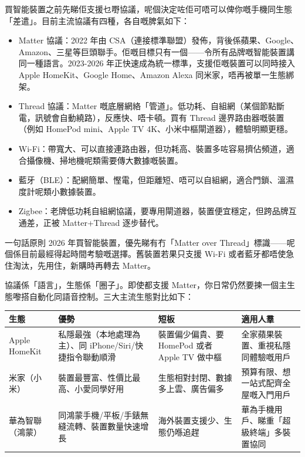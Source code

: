 


買智能裝置之前先睇佢支援乜嘢協議，呢個決定咗佢可唔可以俾你嘅手機同生態「差遣」。目前主流協議有四種，各自嘅脾氣如下：

\begin{itemize}
  \item Matter 協議：2022 年由 CSA（連接標準聯盟）發佈，背後係蘋果、Google、Amazon、三星等巨頭聯手。佢嘅目標只有一個——令所有品牌嘅智能裝置講同一種語言。2023-2026 年正快速成為統一標準，支援佢嘅裝置可以同時接入 Apple HomeKit、Google Home、Amazon Alexa 同米家，唔再被單一生態綁架。
  \item Thread 協議：Matter 嘅底層網絡「管道」。低功耗、自組網（某個節點斷電，訊號會自動繞路），反應快、唔卡頓。買有 Thread 邊界路由器嘅裝置（例如 HomePod mini、Apple TV 4K、小米中樞閘道器），體驗明顯更穩。
  \item Wi-Fi：帶寬大、可以直接連路由器，但功耗高、裝置多咗容易擠佔頻道，適合攝像機、掃地機呢類需要傳大數據嘅裝置。
  \item 藍牙（BLE）：配網簡單、慳電，但距離短、唔可以自組網，適合門鎖、溫濕度計呢類小數據裝置。
  \item Zigbee：老牌低功耗自組網協議，要專用閘道器，裝置便宜穩定，但跨品牌互通差，正被 Matter+Thread 逐步替代。
\end{itemize}

\begin{tcbinfo}{一句話原則}
2026 年買智能裝置，優先睇有冇「Matter over Thread」標識——呢個係目前最經得起時間考驗嘅選擇。舊裝置若果只支援 Wi-Fi 或者藍牙都唔使急住淘汰，先用住，新購時再轉去 Matter。

\end{tcbinfo}


協議係「語言」，生態係「圈子」。即使都支援 Matter，你日常仍然要揀一個主生態嚟搭自動化同語音控制。三大主流生態對比如下：

\begin{center}
\begin{tabularx}{\linewidth}{|X|X|X|X|}
\hline
\textbf{生態} & \textbf{優勢} & \textbf{短板} & \textbf{適用人羣} \tabularnewline
\hline
Apple HomeKit & 私隱最強（本地處理為主）、同 iPhone/Siri/快捷指令聯動順滑 & 裝置偏少偏貴、要 HomePod 或者 Apple TV 做中樞 & 全家蘋果裝置、重視私隱同體驗嘅用戶 \tabularnewline
米家（小米） & 裝置最豐富、性價比最高、小愛同學好用 & 生態相對封閉、數據多上雲、廣告偏多 & 預算有限、想一站式配齊全屋嘅入門用戶 \tabularnewline
華為智聯（鴻蒙） & 同鴻蒙手機/平板/手錶無縫流轉、裝置數量快速增長 & 海外裝置支援少、生態仍喺追趕 & 華為手機用戶、睇重「超級終端」多裝置協同 \tabularnewline
\hline
\end{tabularx}
\end{center}

